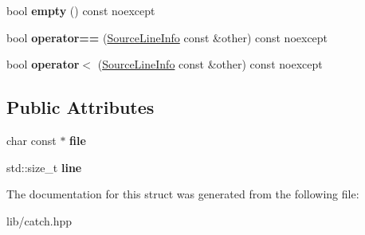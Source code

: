 \begin{DoxyCompactItemize}
bool {\bfseries empty} () const noexcept
\item 
\mbox{\label{struct_catch_1_1_source_line_info_af07e4fdeddf8409b91e4f842f6264cf8}} 
bool {\bfseries operator==} (\mbox{\hyperlink{struct_catch_1_1_source_line_info}{Source\+Line\+Info}} const \&other) const noexcept
\item 
\mbox{\label{struct_catch_1_1_source_line_info_af77415416919d2d6030b4be085b92f7a}} 
bool {\bfseries operator$<$} (\mbox{\hyperlink{struct_catch_1_1_source_line_info}{Source\+Line\+Info}} const \&other) const noexcept
\end{DoxyCompactItemize}
\subsection*{Public Attributes}
\begin{DoxyCompactItemize}
\item 
\mbox{\label{struct_catch_1_1_source_line_info_ad65537703e9f08c1fa7777fbc3f0c617}} 
char const  $\ast$ {\bfseries file}
\item 
\mbox{\label{struct_catch_1_1_source_line_info_a841e5d696c7b9cde24e45e61dd979c77}} 
std\+::size\+\_\+t {\bfseries line}
\end{DoxyCompactItemize}


The documentation for this struct was generated from the following file\+:\begin{DoxyCompactItemize}
\item 
lib/catch.\+hpp\end{DoxyCompactItemize}
